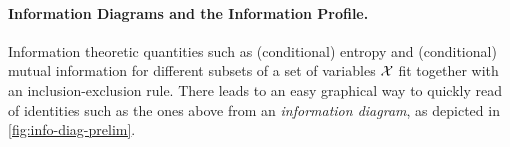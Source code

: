 \paragraph{Information Diagrams and the Information Profile.}
Information theoretic quantities such as (conditional) entropy and (conditional) mutual information for different subsets of a set of variables $\mathcal X$ fit together with an inclusion-exclusion rule. 
There leads to an easy graphical way to quickly read of identities such as the ones above from an \emph{information diagram}, 
as depicted in \cref{fig:info-diag-prelim}.

\begin{figure}
    \centering
    \def\circsize{1.6}
    \def\radsize{0.8}
    \edef\outerrad{1.6}
    \def\innerrad{1.00}
\end{figure}
